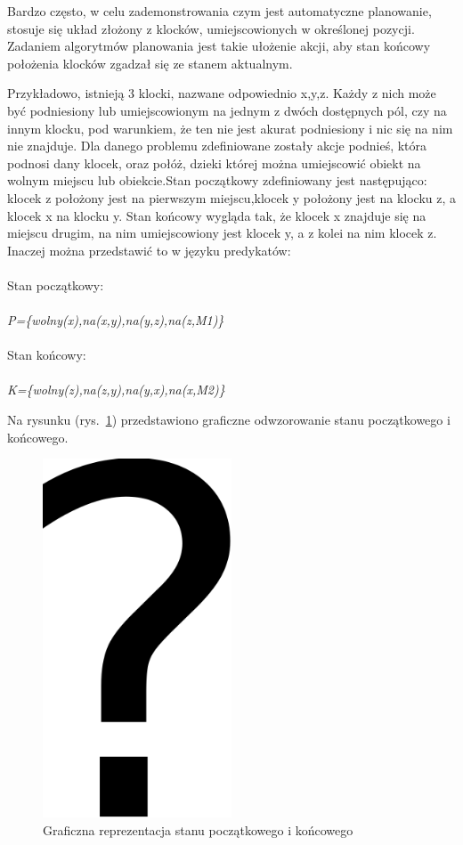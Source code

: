 Bardzo często, w celu zademonstrowania czym jest automatyczne planowanie, stosuje się układ złożony z klocków, umiejscowionych w określonej pozycji. Zadaniem algorytmów planowania jest takie ułożenie akcji, aby stan końcowy położenia klocków zgadzał się ze stanem aktualnym. 

Przykładowo, istnieją 3 klocki, nazwane odpowiednio x,y,z. Każdy z nich może być podniesiony lub umiejscowionym na jednym z dwóch dostępnych pól, czy na innym klocku, pod warunkiem, że ten nie jest akurat podniesiony i nic się na nim nie znajduje. Dla danego problemu zdefiniowane zostały akcje podnieś, która podnosi dany klocek, oraz połóż, dzieki której można umiejscowić obiekt na wolnym miejscu lub obiekcie.Stan początkowy zdefiniowany jest następująco: klocek z położony jest na pierwszym miejscu,klocek y położony jest na klocku z, a klocek x na klocku y. Stan końcowy wygląda tak, że klocek x znajduje się na miejscu drugim, na nim umiejscowiony jest klocek y, a z kolei na nim klocek z. Inaczej można przedstawić to w języku predykatów:
\\\\
Stan początkowy:
\\\\
\textit{P=\{wolny(x),na(x,y),na(y,z),na(z,M1)\}}
\\\\
Stan końcowy:
\\\\
\textit{K=\{wolny(z),na(z,y),na(y,x),na(x,M2)\}}

Na rysunku (rys.~\ref{fig:automatyczne-planowanie}) przedstawiono graficzne odwzorowanie stanu początkowego i końcowego.
\begin{figure}[h!]
    \centering
    \includegraphics[width=0.5\textwidth]{img/rys2,1}
    \caption{Graficzna reprezentacja stanu początkowego i końcowego}
    \label{fig:automatyczne-planowanie}
\end{figure}


